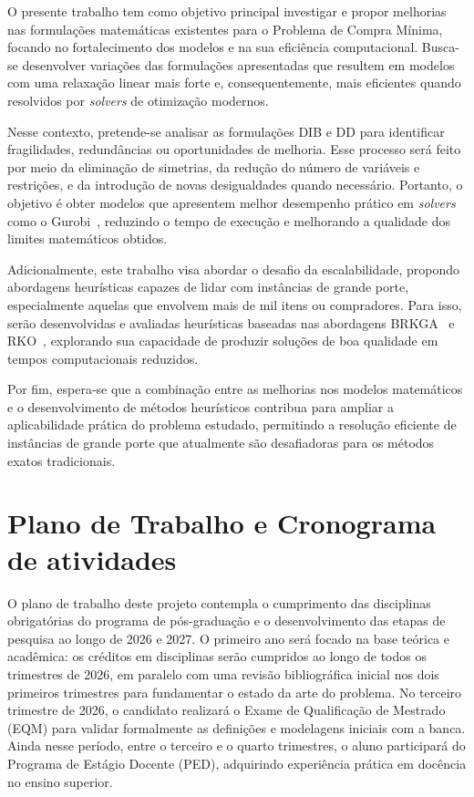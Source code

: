 \documentclass[11pt]{article}
\begin{document}
O presente trabalho tem como objetivo principal investigar e propor melhorias nas formulações matemáticas existentes para o Problema de Compra Mínima, focando no fortalecimento dos modelos e na sua eficiência computacional. Busca-se desenvolver variações das formulações apresentadas que resultem em modelos com uma relaxação linear mais forte e, consequentemente, mais eficientes quando resolvidos por \emph{solvers} de otimização modernos.

Nesse contexto, pretende-se analisar as formulações DIB e DD para identificar fragilidades, redundâncias ou oportunidades de melhoria. Esse processo será feito por meio da eliminação de simetrias, da redução do número de variáveis e restrições, e da introdução de novas desigualdades quando necessário. Portanto, o objetivo é obter modelos que apresentem melhor desempenho prático em \emph{solvers} como o Gurobi~\cite{gurobi}, reduzindo o tempo de execução e melhorando a qualidade dos limites matemáticos obtidos.

Adicionalmente, este trabalho visa abordar o desafio da escalabilidade, propondo abordagens heurísticas capazes de lidar com instâncias de grande porte, especialmente aquelas que envolvem mais de mil itens ou compradores. Para isso, serão desenvolvidas e avaliadas heurísticas baseadas nas abordagens BRKGA~\cite{Resende2013} e RKO~\cite{Chaves2023}, explorando sua capacidade de produzir soluções de boa qualidade em tempos computacionais reduzidos.

Por fim, espera-se que a combinação entre as melhorias nos modelos matemáticos e o desenvolvimento de métodos heurísticos contribua para ampliar a aplicabilidade prática do problema estudado, permitindo a resolução eficiente de instâncias de grande porte que atualmente são desafiadoras para os métodos exatos tradicionais. 
\section{Plano de Trabalho e Cronograma de atividades}

















O plano de trabalho deste projeto contempla o cumprimento das disciplinas obrigatórias do programa de pós-graduação e o desenvolvimento das etapas de pesquisa ao longo de 2026 e 2027. O primeiro ano será focado na base teórica e acadêmica: os créditos em disciplinas serão cumpridos ao longo de todos os trimestres de 2026, em paralelo com uma revisão bibliográfica inicial nos dois primeiros trimestres para fundamentar o estado da arte do problema. No terceiro trimestre de 2026, o candidato realizará o Exame de Qualificação de Mestrado (EQM) para validar formalmente as definições e modelagens iniciais com a banca. Ainda nesse período, entre o terceiro e o quarto trimestres, o aluno participará do Programa de Estágio Docente (PED), adquirindo experiência prática em docência no ensino superior.
\end{document}
